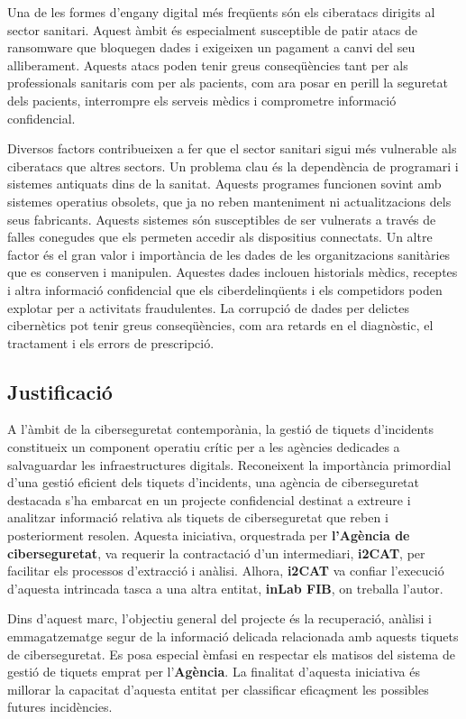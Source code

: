 Una de les formes d'engany digital més freqüents són els ciberatacs dirigits al sector sanitari. Aquest àmbit és especialment susceptible de patir atacs de ransomware que bloquegen dades i exigeixen un pagament a canvi del seu alliberament. Aquests atacs poden tenir greus conseqüències tant per als professionals sanitaris com per als pacients, com ara posar en perill la seguretat dels pacients, interrompre els serveis mèdics i comprometre informació confidencial.

Diversos factors contribueixen a fer que el sector sanitari sigui més vulnerable als ciberatacs que altres sectors. Un problema clau és la dependència de programari i sistemes antiquats dins de la sanitat. Aquests programes funcionen sovint amb sistemes operatius obsolets, que ja no reben manteniment ni actualitzacions dels seus fabricants. Aquests sistemes són susceptibles de ser vulnerats a través de falles conegudes que els permeten accedir als dispositius connectats. Un altre factor és el gran valor i importància de les dades de les organitzacions sanitàries que es conserven i manipulen. Aquestes dades inclouen historials mèdics, receptes i altra informació confidencial que els ciberdelinqüents i els competidors poden explotar per a activitats fraudulentes. La corrupció de dades per delictes cibernètics pot tenir greus conseqüències, com ara retards en el diagnòstic, el tractament i els errors de prescripció.

\subsection{Justificació}
A l'àmbit de la ciberseguretat contemporània, la gestió de tiquets d'incidents constitueix un component operatiu crític per a les agències dedicades a salvaguardar les infraestructures digitals. Reconeixent la importància primordial d'una gestió eficient dels tiquets d'incidents, una agència de ciberseguretat destacada s'ha embarcat en un projecte confidencial destinat a extreure i analitzar informació relativa als tiquets de ciberseguretat que reben i posteriorment resolen. Aquesta iniciativa, orquestrada per \textbf{l'Agència de ciberseguretat}, va requerir la contractació d'un intermediari, \textbf{i2CAT}, per facilitar els processos d'extracció i anàlisi. Alhora, \textbf{i2CAT} va confiar l'execució d'aquesta intrincada tasca a una altra entitat, \textbf{inLab FIB}, on treballa l'autor.

Dins d'aquest marc, l'objectiu general del projecte és la recuperació, anàlisi i emmagatzematge segur de la informació delicada relacionada amb aquests tiquets de ciberseguretat. Es posa especial èmfasi en respectar els matisos del sistema de gestió de tiquets emprat per l'\textbf{Agència}. La finalitat d'aquesta iniciativa és millorar la capacitat d'aquesta entitat per classificar eficaçment les possibles futures incidències.

